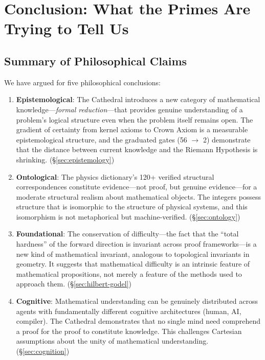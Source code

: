 \section{Conclusion: What the Primes Are Trying to Tell Us}
\label{sec:conclusion}

\subsection{Summary of Philosophical Claims}

We have argued for five philosophical conclusions:

\begin{enumerate}
  \item \textbf{Epistemological}: The Cathedral introduces a new
    category of mathematical knowledge---\emph{formal reduction}---that
    provides genuine understanding of a problem's logical structure
    even when the problem itself remains open. The gradient of
    certainty from kernel axioms to Crown Axiom is a measurable
    epistemological structure, and the graduated gates (56 $\to$ 2)
    demonstrate that the distance between current knowledge and
    the Riemann Hypothesis is shrinking. (\S\ref{sec:epistemology})

  \item \textbf{Ontological}: The physics dictionary's 120+ verified
    structural correspondences constitute evidence---not proof, but
    genuine evidence---for a moderate structural realism about
    mathematical objects. The integers possess structure that is
    isomorphic to the structure of physical systems, and this
    isomorphism is not metaphorical but machine-verified.
    (\S\ref{sec:ontology})

  \item \textbf{Foundational}: The conservation of difficulty---the
    fact that the ``total hardness'' of the forward direction is
    invariant across proof frameworks---is a new kind of mathematical
    invariant, analogous to topological invariants in geometry.
    It suggests that mathematical difficulty is an intrinsic feature
    of mathematical propositions, not merely a feature of the
    methods used to approach them. (\S\ref{sec:hilbert-godel})

  \item \textbf{Cognitive}: Mathematical understanding can be
    genuinely distributed across agents with fundamentally different
    cognitive architectures (human, AI, compiler). The Cathedral
    demonstrates that no single mind need comprehend a proof for
    the proof to constitute knowledge. This challenges Cartesian
    assumptions about the unity of mathematical understanding.
    (\S\ref{sec:cognition})


\end{enumerate}
